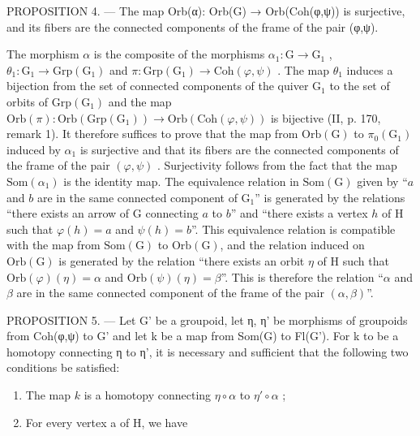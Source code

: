 PROPOSITION 4. --- The map Orb(α): Orb(G) → Orb(Coh(φ,ψ)) is surjective, and its fibers are the connected components of the frame of the pair (φ,ψ).

The morphism \(\alpha\) is the composite of the morphisms \(\alpha_{1}\colon\mathrm{G}\to\mathrm{G}_{1}\) , \(\theta_{1}\colon\mathrm{G}_{1}\to\mathrm{Grp}(\mathrm{G}_{1})\) and \(\pi\colon\mathrm{Grp}(\mathrm{G}_{1})\to\mathrm{Coh}(\varphi,\psi)\) . The map \(\theta_{1}\) induces a bijection from the set of connected components of the quiver \(\mathrm{G}_{1}\) to the set of orbits of \(\mathrm{Grp}(\mathrm{G}_{1})\) and the map \(\mathrm{Orb}(\pi)\colon\mathrm{Orb}(\mathrm{Grp}(\mathrm{G}_{1}))\to\mathrm{Orb}(\mathrm{Coh}(\varphi,\psi))\) is bijective (II, p. 170, remark 1). It therefore suffices to prove that the map from \(\mathrm{Orb}(\mathrm{G})\) to \(\pi_{0}(\mathrm{G}_{1})\) induced by \(\alpha_{1}\) is surjective and that its fibers are the connected components of the frame of the pair \((\varphi,\psi)\) . Surjectivity follows from the fact that the map \(\mathrm{Som}(\alpha_{1})\) is the identity map. The equivalence relation in \(\mathrm{Som}(\mathrm{G})\) given by “\(a\) and \(b\) are in the same connected component of \(\mathrm{G}_{1}\)” is generated by the relations “there exists an arrow of G connecting \(a\) to \(b\)” and “there exists a vertex \(h\) of H such that \(\varphi(h)=a\) and \(\psi(h)=b\)”. This equivalence relation is compatible with the map from \(\mathrm{Som}(\mathrm{G})\) to \(\mathrm{Orb}(\mathrm{G})\), and the relation induced on \(\mathrm{Orb}(\mathrm{G})\) is generated by the relation “there exists an orbit \(\eta\) of H such that \(\mathrm{Orb}(\varphi)(\eta)=\alpha\) and \(\mathrm{Orb}(\psi)(\eta)=\beta\)”. This is therefore the relation “\(\alpha\) and \(\beta\) are in the same connected component of the frame of the pair \((\alpha,\beta)\)”.

PROPOSITION 5. --- Let G' be a groupoid, let η, η' be morphisms of groupoids from Coh(φ,ψ) to G' and let k be a map from Som(G) to Fl(G'). For k to be a homotopy connecting η to η', it is necessary and sufficient that the following two conditions be satisfied:

\begin{enumerate}
\def\labelenumi{(\roman{enumi})}
\item
  The map \(k\) is a homotopy connecting \(\eta \circ \alpha\) to \(\eta' \circ \alpha\) ;
\item
  For every vertex a of H, we have
\end{enumerate}

